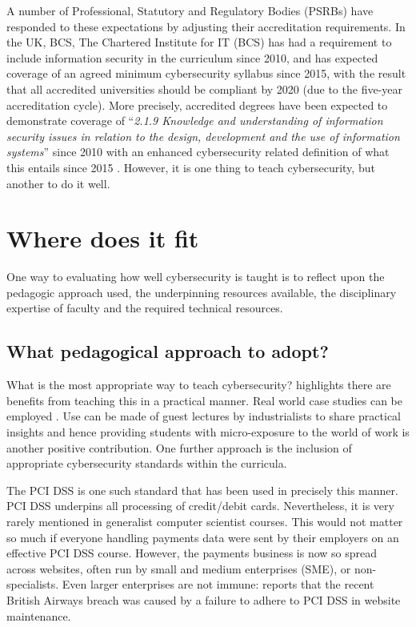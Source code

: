 \documentclass[sigconf]{acmart}
\begin{document}
A number of Professional, Statutory and Regulatory Bodies (PSRBs) have
responded to these expectations by adjusting their accreditation
requirements. In the UK, BCS, The Chartered Institute for IT (BCS) has
had a requirement to include information security in the curriculum
since 2010, and has expected coverage of an agreed minimum
cybersecurity syllabus since 2015, with the result that all accredited
universities should be compliant by 2020 (due to the five-year
accreditation cycle). More precisely, accredited degrees have been
expected to demonstrate coverage of ``{\emph{2.1.9 Knowledge and
    understanding of information security issues in relation to the
    design, development and the use of information systems}}''
\cite[p.~30]{BCS2018a} since 2010 with an enhanced cybersecurity
related definition of what this entails since 2015
\cite[p.~17--18]{BCS2018a}. However, it is one thing to teach
cybersecurity, but another to do it well. 

\section {Where does it fit}


One way to evaluating how well cybersecurity is taught is to reflect upon the pedagogic approach used, the underpinning resources available, the disciplinary expertise of faculty and the required technical resources.

\subsection{What pedagogical approach to adopt?}
What is the most appropriate way to teach cybersecurity? \cite{Weiss:2013:THC:2527148.2527180} highlights there are benefits from teaching this in a practical manner. Real world case studies can be employed \cite{BritishAirways2018a}. Use can be made of guest lectures by industrialists to share practical insights and hence providing students with micro-exposure to the world of work is another positive contribution. One further approach is the inclusion of appropriate cybersecurity standards within the curricula.

The PCI DSS \cite{PCI2018b} is one such standard that has been used in precisely this manner. PCI DSS underpins all processing of credit/debit cards. Nevertheless, it is very rarely mentioned in generalist computer scientist courses. This would not matter so much if everyone handling payments data were sent by their employers on an effective PCI DSS course. However, the payments business is now so spread across websites, often run by small and medium enterprises (SME), or non-specialists. Even larger enterprises are not immune: \cite{BritishAirways2018a} reports that the recent British Airways breach was caused by a failure to adhere to PCI DSS in website maintenance.
\end{document}
